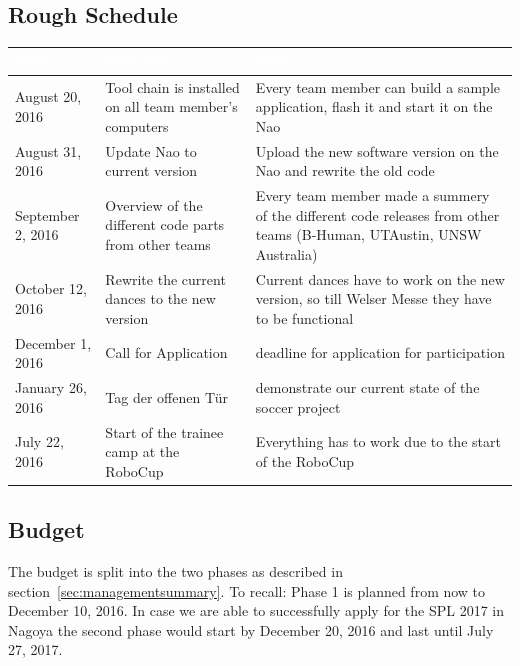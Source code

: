 \documentclass[12pt]{article}
\theoremstyle{definition}
\begin{document}
\subsection{Rough Schedule}

\begin{tabular}{|p{}|p{}|p{}|}
\hline
\cellcolor[gray]{0.5}\textcolor{white}{Date} & \cellcolor[gray]{0.45}\textcolor{white}{Milestone} & \cellcolor[gray]{0.5}\textcolor{white}{DoD} \\ \hline
August 20, 2016 & Tool chain is installed on all team member's computers & Every team member can build a sample application, flash it and start it on the Nao \\ \hline
August 31, 2016 & Update Nao to current version & Upload the new software version on the Nao and rewrite the old code \\ \hline
September 2, 2016 & Overview of the different code parts from other teams & Every team member made a summery of the different code releases from other teams (B-Human, UTAustin, UNSW Australia) \\ \hline
October 12, 2016 & Rewrite the current dances to the new version & Current dances have to work on the new version, so till Welser Messe they have to be functional \\ \hline
December 1, 2016 & Call for Application & deadline for application for participation \\ \hline
January 26, 2016 & Tag der offenen Tür & demonstrate our current state of the soccer project \\ \hline
July 22, 2016 & Start of the trainee camp at the RoboCup & Everything has to work due to the start of the RoboCup\\ \hline
\end{tabular}


\subsection{Budget}
The budget is split into the two phases as described in section~\ref{sec:managementsummary}. To recall: Phase 1 is planned from now to December 10, 2016. In case we are able to successfully apply for the SPL 2017 in Nagoya the second phase would start by December 20, 2016 and last until July 27, 2017.
\end{document}
